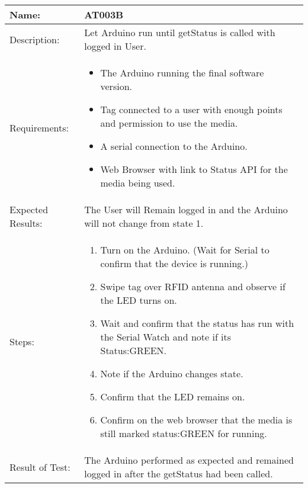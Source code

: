\begin{table}[h]
	\centering
		\begin{tabular}{|l|p{9cm}|}
		\hline
		\hline
		Name: & AT003B\\
		\hline
		Description: & Let Arduino run until getStatus is called with logged in User.\\
		\hline
		Requirements: & 
		\begin{itemize}
			\item The Arduino running the final software version.
			\item Tag connected to a user with enough points and permission to use the media.
			\item A serial connection to the Arduino.
			\item Web Browser with link to Status API for the media being used.
		\end{itemize}\\
		\hline
		Expected Results: & The User will Remain logged in and the Arduino will not change from state 1.
		\\
		\hline
		Steps: & 
		\begin{enumerate}
			\item Turn on the Arduino. (Wait for Serial to confirm that the device is running.)
			\item Swipe tag over RFID antenna and observe if the LED turns on.
			\item Wait and confirm that the status has run with the Serial Watch and note if its Status:GREEN.
			\item Note if the Arduino changes state.
			\item Confirm that the LED remains on.
			\item Confirm on the web browser that the media is still marked status:GREEN for running.
		\end{enumerate}
		\\
		\hline
		Result of Test: & The Arduino performed as expected and remained logged in after the getStatus had been called.\\
		\hline
		\end{tabular}
\end{table}

